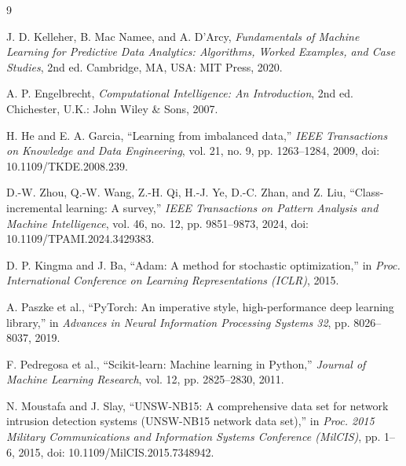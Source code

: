 \documentclass[conference]{IEEEtran}
\begin{document}
\begin{thebibliography}{9}

J. D. Kelleher, B. Mac Namee, and A. D'Arcy,
\textit{Fundamentals of Machine Learning for Predictive Data Analytics: Algorithms, Worked Examples, and Case Studies},
2nd ed. Cambridge, MA, USA: MIT Press, 2020.

A. P. Engelbrecht,
\textit{Computational Intelligence: An Introduction},
2nd ed. Chichester, U.K.: John Wiley \& Sons, 2007.

H. He and E. A. Garcia,
``Learning from imbalanced data,''
\textit{IEEE Transactions on Knowledge and Data Engineering},
vol. 21, no. 9, pp. 1263--1284, 2009,
doi: 10.1109/TKDE.2008.239.

D.-W. Zhou, Q.-W. Wang, Z.-H. Qi, H.-J. Ye, D.-C. Zhan, and Z. Liu,
``Class-incremental learning: A survey,''
\textit{IEEE Transactions on Pattern Analysis and Machine Intelligence},
vol. 46, no. 12, pp. 9851--9873, 2024,
doi: 10.1109/TPAMI.2024.3429383.

D. P. Kingma and J. Ba,
``Adam: A method for stochastic optimization,''
in \textit{Proc. International Conference on Learning Representations (ICLR)}, 2015.

A. Paszke et al.,
``PyTorch: An imperative style, high-performance deep learning library,''
in \textit{Advances in Neural Information Processing Systems 32},
pp. 8026--8037, 2019.

F. Pedregosa et al.,
``Scikit-learn: Machine learning in Python,''
\textit{Journal of Machine Learning Research},
vol. 12, pp. 2825--2830, 2011.

N. Moustafa and J. Slay,
``UNSW-NB15: A comprehensive data set for network intrusion detection systems (UNSW-NB15 network data set),''
in \textit{Proc. 2015 Military Communications and Information Systems Conference (MilCIS)},
pp. 1--6, 2015,
doi: 10.1109/MilCIS.2015.7348942.


\end{thebibliography}

\newpage

%
%
%
\end{document}
